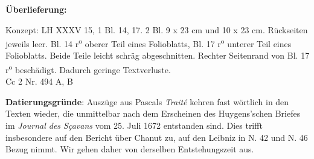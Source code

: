       
               
                \begin{ledgroupsized}[r]{120mm}
                \footnotesize 
                \pstart                
                \noindent\textbf{\"{U}berlieferung:}   
                \pend
                \end{ledgroupsized}
            
              
                            \begin{ledgroupsized}[r]{114mm}
                            \footnotesize 
                            \pstart \parindent -6mm
                            Konzept: LH XXXV 15, 1 Bl. 14, 17. 2 Bl. 9 x 23 cm und 10 x 23 cm. R\"{u}ckseiten jeweils leer. Bl. 14 r\textsuperscript{o} oberer Teil eines Folioblatts, Bl. 17 r\textsuperscript{o} unterer Teil eines Folioblatts. Beide Teile leicht schr\"{a}g abgeschnitten. Rechter Seitenrand von Bl. 17 r\textsuperscript{o} besch\"{a}digt. Dadurch geringe Textverluste.\\Cc 2 Nr. 494 A, B \pend
                            \end{ledgroupsized}
                \vspace*{5mm}
                \begin{ledgroup}
                \footnotesize 
                \pstart
            \noindent\footnotesize{\textbf{Datierungsgr\"{u}nde}: Ausz\"{u}ge aus Pascals \cite{00081}\textit{Trait\'{e}} kehren fast w\"{o}rtlich in den Texten wieder, die unmittelbar nach dem Erscheinen des Huygens'schen Briefes im \cite{00062}\textit{Journal des S\c{c}avans} vom 25. Juli 1672 entstanden sind. Dies trifft insbesondere auf den Bericht \"{u}ber Chanut zu, auf den Leibniz in N. 42 und N. 46 Bezug nimmt. Wir gehen daher von derselben Entstehungszeit aus.}
                \pend
                \end{ledgroup}
            
